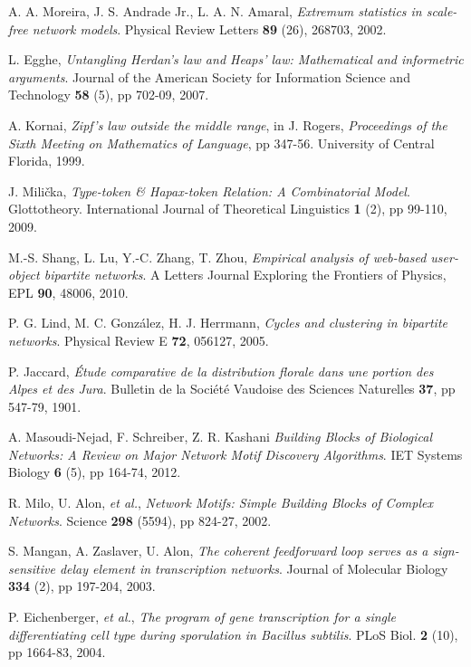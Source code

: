 \begin{thebibliography}{99}
  A. A. Moreira, J. S. Andrade Jr., L. A. N. Amaral,
  \emph{Extremum statistics in scale-free network models}.
  Physical Review Letters \textbf{89} (26), 268703,
  2002.
  
  L. Egghe,
  \emph{Untangling Herdan's law and Heaps' law: Mathematical and informetric arguments}.
  Journal of the American Society for Information Science and Technology \textbf{58} (5), pp 702-09,
  2007.

  A. Kornai,
  \emph{Zipf's law outside the middle range}, in J. Rogers, \emph{Proceedings of the Sixth Meeting on Mathematics of Language}, pp 347-56.
  University of Central Florida,
  1999.

  J. Milička,
  \emph{Type-token \& Hapax-token Relation: A Combinatorial Model}.
  Glottotheory. International Journal of Theoretical Linguistics \textbf{1} (2), pp 99-110,
  2009.

  M.-S. Shang, L. Lu, Y.-C. Zhang, T. Zhou,
  \emph{Empirical analysis of web-based user-object bipartite networks}.
  A Letters Journal Exploring the Frontiers of Physics, EPL \textbf{90}, 48006,
  2010.

  P. G. Lind, M. C. González, H. J. Herrmann,
  \emph{Cycles and clustering in bipartite networks}.
  Physical Review E \textbf{72}, 056127,
  2005.

  P. Jaccard,
  \emph{Étude comparative de la distribution florale dans une portion des Alpes et des Jura}.
  Bulletin de la Société Vaudoise des Sciences Naturelles \textbf{37}, pp 547-79,
  1901.

  A. Masoudi-Nejad, F. Schreiber, Z. R. Kashani
  \emph{Building Blocks of Biological Networks: A Review on Major Network Motif Discovery Algorithms}.
  IET Systems Biology \textbf{6} (5), pp 164-74,
  2012.

  R. Milo, U. Alon, \textit{et al.},
  \emph{Network Motifs: Simple Building Blocks of Complex Networks}.
  Science \textbf{298} (5594), pp 824-27,
  2002.

  S. Mangan, A. Zaslaver, U. Alon,
  \emph{The coherent feedforward loop serves as a sign-sensitive delay element in transcription networks}.
  Journal of Molecular Biology \textbf{334} (2), pp 197-204,
  2003.

  P. Eichenberger, \textit{et al.},
  \emph{The program of gene transcription for a single differentiating cell type during sporulation in Bacillus subtilis}.
  PLoS Biol. \textbf{2} (10), pp 1664-83,
  2004.


\end{thebibliography}
